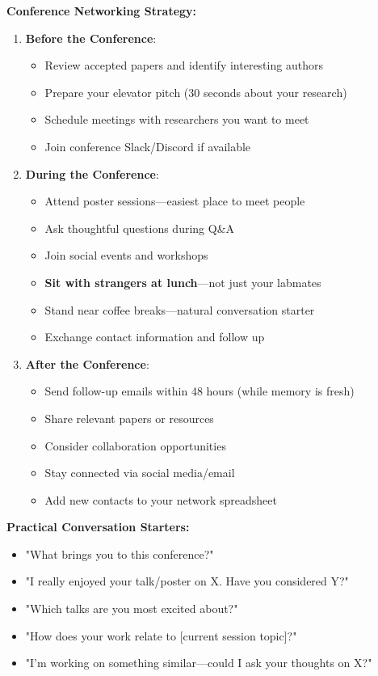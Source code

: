 \documentclass[11pt,a4paper]{article}
\begin{document}
\textbf{Conference Networking Strategy:}
\begin{enumerate}
    \item \textbf{Before the Conference}:
    \begin{itemize}
        \item Review accepted papers and identify interesting authors
        \item Prepare your elevator pitch (30 seconds about your research)
        \item Schedule meetings with researchers you want to meet
        \item Join conference Slack/Discord if available
    \end{itemize}
    
    \item \textbf{During the Conference}:
    \begin{itemize}
        \item Attend poster sessions—easiest place to meet people
        \item Ask thoughtful questions during Q\&A
        \item Join social events and workshops
        \item \textbf{Sit with strangers at lunch}—not just your labmates
        \item Stand near coffee breaks—natural conversation starter
        \item Exchange contact information and follow up
    \end{itemize}
    
    \item \textbf{After the Conference}:
    \begin{itemize}
        \item Send follow-up emails within 48 hours (while memory is fresh)
        \item Share relevant papers or resources
        \item Consider collaboration opportunities
        \item Stay connected via social media/email
        \item Add new contacts to your network spreadsheet
    \end{itemize}
\end{enumerate}

\textbf{Practical Conversation Starters:}
\begin{itemize}
    \item "What brings you to this conference?"
    \item "I really enjoyed your talk/poster on X. Have you considered Y?"
    \item "Which talks are you most excited about?"
    \item "How does your work relate to [current session topic]?"
    \item "I'm working on something similar—could I ask your thoughts on X?"
\end{itemize}
\end{document}
